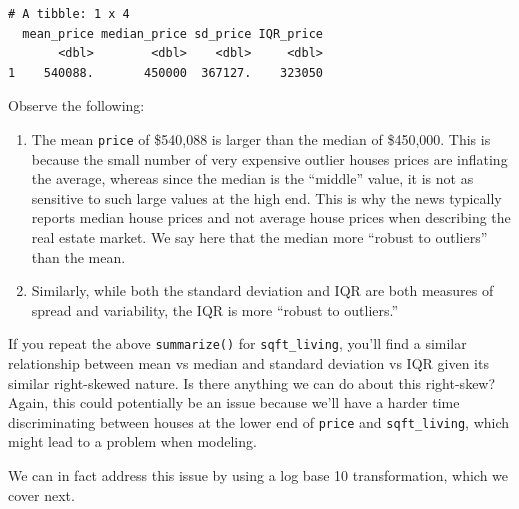 \documentclass[12pt,]{krantz}
\makeatletter
\newenvironment{Shaded}{\begin{snugshade}}{\end{snugshade}}
\newcommand{\KeywordTok}[1]{\textcolor[rgb]{0.27,0.27,0.27}{\textbf{#1}}}
\newcommand{\DataTypeTok}[1]{\textcolor[rgb]{0.27,0.27,0.27}{#1}}
\newcommand{\StringTok}[1]{\textcolor[rgb]{0.5,0.5,0.5}{#1}}
\newcommand{\OperatorTok}[1]{\textcolor[rgb]{0.43,0.43,0.43}{\textbf{#1}}}
\newcommand{\NormalTok}[1]{#1}
\providecommand{\tightlist}{%
  \setlength{\itemsep}{0pt}\setlength{\parskip}{0pt}}
\newenvironment{kframe}{%
\medskip{}
\setlength{\fboxsep}{.8em}
 \def\at@end@of@kframe{}%
 \ifinner\ifhmode%
  \def\at@end@of@kframe{\end{minipage}}%
  \begin{minipage}{\columnwidth}%
 \fi\fi%
 \def\FrameCommand##1{\hskip\@totalleftmargin \hskip-\fboxsep
 \colorbox{shadecolor}{##1}\hskip-\fboxsep
     \hskip-\linewidth \hskip-\@totalleftmargin \hskip\columnwidth}%
 \MakeFramed {\advance\hsize-\width
   \@totalleftmargin\z@ \linewidth\hsize
   \@setminipage}}%
 {\par\unskip\endMakeFramed%
 \at@end@of@kframe}
\renewenvironment{Shaded}{\begin{kframe}}{\end{kframe}}
\makeatother
\begin{document}
\begin{Shaded}
\end{Shaded}

\begin{verbatim}
# A tibble: 1 x 4
  mean_price median_price sd_price IQR_price
       <dbl>        <dbl>    <dbl>     <dbl>
1    540088.       450000  367127.    323050
\end{verbatim}

Observe the following:

\begin{enumerate}
\def\labelenumi{\arabic{enumi}.}
\tightlist
\item
  The mean \texttt{price} of \$540,088 is larger than the median of
  \$450,000. This is because the small number of very expensive outlier
  houses prices are inflating the average, whereas since the median is
  the ``middle'' value, it is not as sensitive to such large values at
  the high end. This is why the news typically reports median house
  prices and not average house prices when describing the real estate
  market. We say here that the median more ``robust to outliers'' than
  the mean.
\item
  Similarly, while both the standard deviation and IQR are both measures
  of spread and variability, the IQR is more ``robust to outliers.''
\end{enumerate}

If you repeat the above \texttt{summarize()} for \texttt{sqft\_living},
you'll find a similar relationship between mean vs median and standard
deviation vs IQR given its similar right-skewed nature. Is there
anything we can do about this right-skew? Again, this could potentially
be an issue because we'll have a harder time discriminating between
houses at the lower end of \texttt{price} and \texttt{sqft\_living},
which might lead to a problem when modeling.

We can in fact address this issue by using a log base 10 transformation,
which we cover next.
\end{document}
